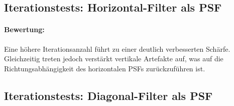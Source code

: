 \noindent
\begin{minipage}[t]{0.33\textwidth}
\end{minipage}
%
\begin{minipage}[t]{0.33\textwidth}
\end{minipage}
%
\begin{minipage}[t]{0.33\textwidth}
\end{minipage}




\subsection{Iterationstests: Horizontal-Filter als PSF}

\paragraph{Bewertung:}
Eine höhere Iterationsanzahl führt zu einer deutlich verbesserten Schärfe. Gleichzeitig treten jedoch verstärkt vertikale Artefakte auf, was auf die Richtungsabhängigkeit des horizontalen PSFs zurückzuführen ist.

\noindent
\begin{minipage}[t]{0.33\textwidth}
\end{minipage}
%
\begin{minipage}[t]{0.33\textwidth}
\end{minipage}
%
\begin{minipage}[t]{0.33\textwidth}
\end{minipage}




\subsection{Iterationstests: Diagonal-Filter als PSF}


